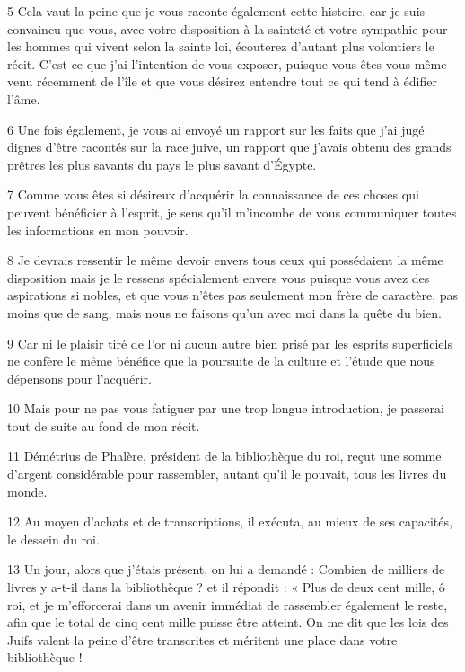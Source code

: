 \par 5 Cela vaut la peine que je vous raconte également cette histoire, car je suis convaincu que vous, avec votre disposition à la sainteté et votre sympathie pour les hommes qui vivent selon la sainte loi, écouterez d'autant plus volontiers le récit. C'est ce que j'ai l'intention de vous exposer, puisque vous êtes vous-même venu récemment de l'île et que vous désirez entendre tout ce qui tend à édifier l'âme.

\par 6 Une fois également, je vous ai envoyé un rapport sur les faits que j'ai jugé dignes d'être racontés sur la race juive, un rapport que j'avais obtenu des grands prêtres les plus savants du pays le plus savant d'Égypte.

\par 7 Comme vous êtes si désireux d'acquérir la connaissance de ces choses qui peuvent bénéficier à l'esprit, je sens qu'il m'incombe de vous communiquer toutes les informations en mon pouvoir.

\par 8 Je devrais ressentir le même devoir envers tous ceux qui possédaient la même disposition mais je le ressens spécialement envers vous puisque vous avez des aspirations si nobles, et que vous n'êtes pas seulement mon frère de caractère, pas moins que de sang, mais nous ne faisons qu'un avec moi dans la quête du bien.

\par 9 Car ni le plaisir tiré de l'or ni aucun autre bien prisé par les esprits superficiels ne confère le même bénéfice que la poursuite de la culture et l'étude que nous dépensons pour l'acquérir.

\par 10 Mais pour ne pas vous fatiguer par une trop longue introduction, je passerai tout de suite au fond de mon récit.

\par 11 Démétrius de Phalère, président de la bibliothèque du roi, reçut une somme d'argent considérable pour rassembler, autant qu'il le pouvait, tous les livres du monde.

\par 12 Au moyen d'achats et de transcriptions, il exécuta, au mieux de ses capacités, le dessein du roi.

\par 13 Un jour, alors que j'étais présent, on lui a demandé : Combien de milliers de livres y a-t-il dans la bibliothèque ? et il répondit : « Plus de deux cent mille, ô roi, et je m'efforcerai dans un avenir immédiat de rassembler également le reste, afin que le total de cinq cent mille puisse être atteint. On me dit que les lois des Juifs valent la peine d'être transcrites et méritent une place dans votre bibliothèque !

